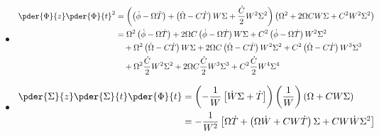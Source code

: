 \begin{itemize}
\item
\begin{equation}
\begin{split}
\pder{\Phi}{z} \pder{\Phi}{t}^2 & =  \left( \left(\dot{\phi}- \Omega\dot{T}\right) + \left(\dot{\Omega}- C\dot{T}\right)W \Sigma  + \frac{\dot{C}}{2}W^2 \Sigma^2  \right)\left(\Omega^2 + 2\Omega CW\Sigma + C^2 W^2 \Sigma^2\right) \\
& = \Omega^2  \left(\dot{\phi}- \Omega\dot{T}\right) +  2\Omega C  \left(\dot{\phi}- \Omega\dot{T}\right)W \Sigma + C^2  \left(\dot{\phi}- \Omega\dot{T}\right) W^2 \Sigma^2 \\
&\quad + \Omega^2 \left(\dot{\Omega}- C\dot{T}\right) W\Sigma  +  2 \Omega C \left(\dot{\Omega}- C\dot{T}\right) W^2 \Sigma^2 + C^2 \left(\dot{\Omega}- C\dot{T}\right)W^3 \Sigma^3 \\
&\quad  + \Omega^2 \frac{\dot{C}}{2}W^2 \Sigma^2  +  2 \Omega C \frac{\dot{C}}{2}W^3 \Sigma^3 + C^2 \frac{\dot{C}}{2}W^4 \Sigma^4 \\
\end{split}
\end{equation}

\item
\begin{equation}
\begin{split}
\pder{\Sigma}{z} \pder{\Sigma}{t} \pder{\Phi}{t} & = \left(-\frac{1}{W}\left[\dot{W}\Sigma  + \dot{T}\right] \right) \left( \frac{1}{W} \right) \left(\Omega + C W\Sigma \right) \\
                         & = -\frac{1}{W^2}\left[ \Omega \dot{T} + \left(\Omega \dot{W}  +  C W\dot{T} \right) \Sigma  + C  W \dot{W}\Sigma^2  \right]  
\end{split}
\end{equation}
\end{itemize}

